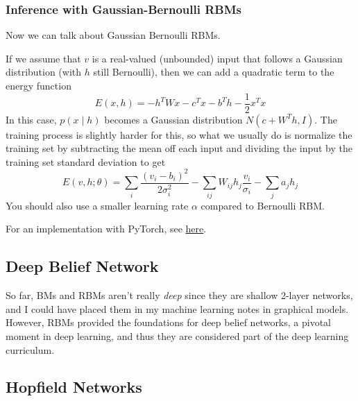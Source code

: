   \subsubsection{Inference with Gaussian-Bernoulli RBMs}

    Now we can talk about Gaussian Bernoulli RBMs. 

    \begin{definition} 
      If we assume that $v$ is a real-valued (unbounded) input that follows a Gaussian distribution (with $h$ still Bernoulli), then we can add a quadratic term to the energy function 
      \begin{equation} 
        E(x, h) = - h^T W x - c^T x - b^T h - \frac{1}{2} x^T x
      \end{equation}
      In this case, $p(x \mid h)$ becomes a Gaussian distribution $N(c + W^T h, I)$. The training process is slightly harder for this, so what we usually do is normalize the training set by subtracting the mean off each input and dividing the input by the training set standard deviation to get  
      \begin{equation} 
        E(v, h; \theta) = \sum_i \frac{(v_i - b_i)^2}{2 \sigma_i^2} - \sum_{ij} W_{ij} h_j \frac{v_i}{\sigma_i} - \sum_j a_j h_j
      \end{equation}
      You should also use a smaller learning rate $\alpha$ compared to Bernoulli RBM. 
    \end{definition} 

    \begin{algo}[Implementation]
      For an implementation with PyTorch, see \href{code/rbm.html}{here}. 
    \end{algo}

\subsection{Deep Belief Network} 

  So far, BMs and RBMs aren't really \textit{deep} since they are shallow 2-layer networks, and I could have placed them in my machine learning notes in graphical models. However, RBMs provided the foundations for deep belief networks, a pivotal moment in deep learning, and thus they are considered part of the deep learning curriculum. 

\subsection{Hopfield Networks}

